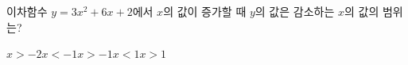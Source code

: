 이차함수 $y=3x^2+6x+2$에서 $x$의 값이 증가할 때 $y$의 값은 감소하는 $x$의 값의 범위는?
\begin{choices32}{$x>-2$}{$x<-1$}{$x>-1$}{$x<1$}{$x>1$}\end{choices32}
